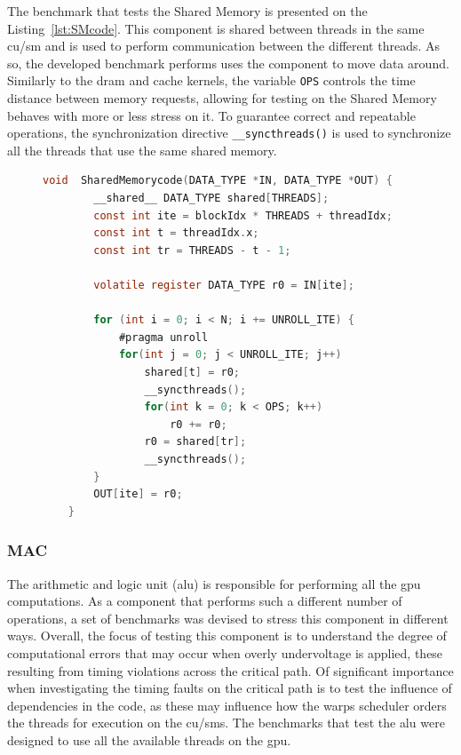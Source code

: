 The benchmark that tests the Shared Memory is presented on the Listing~\ref{lst:SMcode}. This component is shared between threads in the same \acrshort{cu}/\acrshort{sm} and is used to perform communication between the different threads. As so, the developed benchmark performs uses the component to move data around. Similarly to the \acrshort{dram} and cache kernels, the variable \texttt{OPS} controls the time distance between memory requests, allowing for testing on the Shared Memory behaves with more or less stress on it. To guarantee correct and repeatable operations, the synchronization directive \texttt{\_\_syncthreads()} is used to synchronize all the threads that use the same shared memory.

\begin{figure}[h]
    \begin{lstlisting}[language=C, caption=Shared Memory Benchmark code, label=lst:SMcode, basicstyle=\footnotesize\ttfamily, abovecaptionskip=0pt, captionpos=b]
    void  SharedMemorycode(DATA_TYPE *IN, DATA_TYPE *OUT) {
        __shared__ DATA_TYPE shared[THREADS];
        const int ite = blockIdx * THREADS + threadIdx;
        const int t = threadIdx.x;
        const int tr = THREADS - t - 1;
        
        volatile register DATA_TYPE r0 = IN[ite];
        
        for (int i = 0; i < N; i += UNROLL_ITE) {
            #pragma unroll
            for(int j = 0; j < UNROLL_ITE; j++)  
                shared[t] = r0;
                __syncthreads();
                for(int k = 0; k < OPS; k++) 
                    r0 += r0;
                r0 = shared[tr];
                __syncthreads();
        }
        OUT[ite] = r0;
    }
    \end{lstlisting}
\end{figure}

\subsubsection{MAC}

The arithmetic and logic unit (\acrshort{alu}) is responsible for performing all the \acrshort{gpu} computations.  As a component that performs such a different number of operations, a set of benchmarks was devised to stress this component in different ways. Overall, the focus of testing this component is to understand the degree of computational errors that may occur when overly undervoltage is applied, these resulting from timing violations across the critical path. Of significant importance when investigating the timing faults on the critical path is to test the influence of dependencies in the code, as these may influence how the warps scheduler orders the threads for execution on the \acrshort{cu}/\acrshort{sm}s. The benchmarks that test the \acrshort{alu} were designed to use all the available threads on the \acrshort{gpu}.

